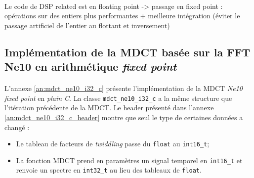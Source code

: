 \documentclass{article}
\begin{document}
    \paragraph{}
    Le code de DSP related est en floating point -> passage en fixed point : opérations sur des entiers plus performantes + meilleure intégration (éviter le passage artificiel de l'entier au flottant et inversement)




    \subsection{Implémentation de la MDCT basée sur la FFT Ne10 en arithmétique \emph{fixed point}}
    \label{sec:ne10_mdct_i32_c}
    \paragraph{}
    L'annexe \ref{an:mdct_ne10_i32_c} présente l'implémentation de la MDCT \emph{Ne10 fixed point} en \emph{plain C}. La classe \texttt{mdct\_ne10\_i32\_c} a la même structure que l'itération précédente de la MDCT. Le header présenté dans l'annexe \ref{an:mdct_ne10_i32_c_header} montre que seul le type de certaines données a changé :
    \begin{itemize}
        \item Le tableau de facteurs de \emph{twiddling} passe du \texttt{float} au \texttt{int16\_t};
        \item La fonction MDCT prend en paramètres un signal temporel en \texttt{int16\_t} et renvoie un spectre en \texttt{int32\_t} au lieu des tableaux de \texttt{float}.
    \end{itemize}
\end{document}
